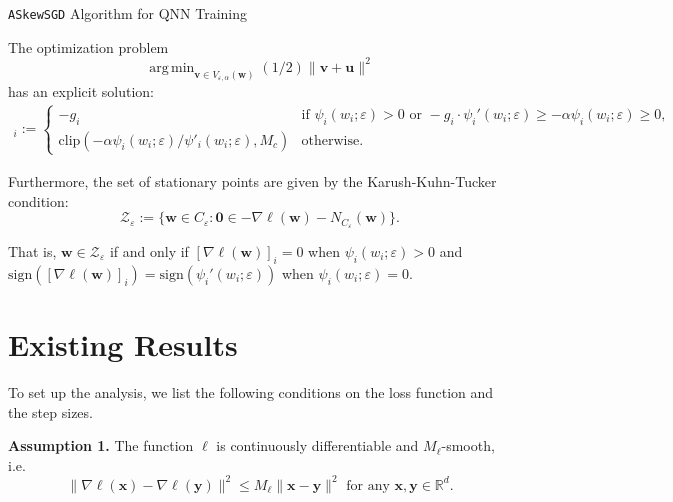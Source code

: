 \documentclass[10pt,a4paper]{article}
\DeclareMathOperator*{\argmin}{arg\,min}
\begin{document}
\begin{algorithm}[H]
  \caption{\texttt{ASkewSGD} Algorithm for QNN Training}
\end{algorithm}

The optimization problem \[\argmin_{\mathbf{v}\in V_{\varepsilon, \alpha}(\mathbf{w})} (1/2) \lVert \mathbf{v}+\mathbf{u}\rVert^2\] has an explicit solution:
\begin{align*}[\mathbf{s}_{\varepsilon, \alpha}(\mathbf{g},\mathbf{w})]_i:=\begin{cases}-g_i                                                    & \text{if }\psi_i(w_i;\varepsilon)>0 \text{ or }-g_i\cdot \psi_i'(w_i;\varepsilon)\geq -\alpha \psi_i(w_i;\varepsilon)\geq 0, \\
             \text{clip}(-\alpha\psi_i(w_i;\varepsilon)/\psi'_i(w_i;\varepsilon), M_c) & \text{otherwise}.\end{cases}
\end{align*}

Furthermore, the set of stationary points are given by the Karush-Kuhn-Tucker condition:
\[\mathcal{Z}_\varepsilon:=\{\mathbf{w}\in C_\varepsilon: \mathbf{0}\in -\nabla \ell(\mathbf{w})-N_{C_\varepsilon}(\mathbf{w})\}.\]

That is, $\mathbf{w}\in \mathcal{Z}_\varepsilon$ if and only if $[\nabla\ell(\mathbf{w})]_i=0$ when $\psi_i(w_i;\varepsilon)> 0$ and $\text{sign}([\nabla\ell(\mathbf{w})]_i)=\text{sign}(\psi_i'(w_i;\varepsilon))$ when $\psi_i(w_i;\varepsilon)= 0$.

\section{Existing Results} 

To set up the analysis, we list the following conditions on the loss function and the step sizes.

\textbf{Assumption 1.} The function $\ell$ is continuously differentiable and $M_\ell$-smooth, i.e. \[\lVert \nabla\ell(\mathbf{x})-\nabla \ell(\mathbf{y})\rVert^2\leq M_\ell \lVert \mathbf{x}-\mathbf{y}\rVert^2\text{ for any }\mathbf{x}, \mathbf{y}\in\mathbb{R}^d.\]
\end{document}
